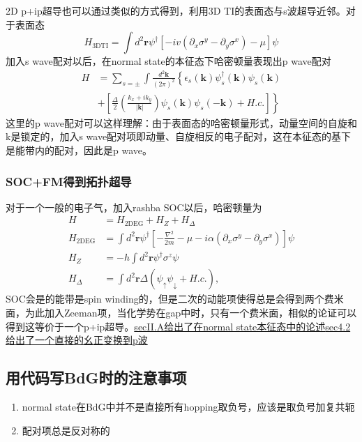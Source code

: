 \documentclass[10pt,openany]{book}
\theoremstyle{thmstyle} %
\theoremstyle{defstyle} %
\theoremstyle{prostyle} %
\begin{document}
2D p+ip超导也可以通过类似的方式得到，利用3D TI的表面态与s波超导近邻。对于表面态
\begin{equation}
  H_{3 \mathrm{DTI}}=\int d^2 \mathbf{r} \psi^{\dagger}\left[-i v\left(\partial_x \sigma^y-\partial_y \sigma^x\right)-\mu\right] \psi
\end{equation}
加入s wave配对以后，在normal state的本征态下哈密顿量表现出p wave配对
\begin{equation}
  \begin{aligned}
    H & =\sum_{s= \pm} \int \frac{d^2 \mathbf{k}}{(2 \pi)^2}\left\{\epsilon_s(\mathbf{k}) \psi_s^{\dagger}(\mathbf{k}) \psi_s(\mathbf{k})\right. \\
    & \left.+\left[\frac{\Delta}{2}\left(\frac{k_x+i k_y}{|\mathbf{k}|}\right) \psi_s(\mathbf{k}) \psi_s(-\mathbf{k})+H . c .\right]\right\}
    \end{aligned}
\end{equation}
这里的p wave配对可以这样理解：由于表面态的哈密顿量形式，动量空间的自旋和k是锁定的，加入s wave配对项即动量、自旋相反的电子配对，这在本征态的基下是能带内的配对，因此是p wave。
\subsubsection{SOC+FM得到拓扑超导}
对于一个一般的电子气，加入rashba SOC以后，哈密顿量为
\begin{equation}
  \begin{aligned}
    H & =H_{2 \mathrm{DEG}}+H_Z+H_{\Delta} \\
    H_{2 \mathrm{DEG}} & =\int d^2 \mathbf{r} \psi^{\dagger}\left[-\frac{\nabla^2}{2 m}-\mu-i \alpha\left(\partial_x \sigma^y-\partial_y \sigma^x\right)\right]\psi \\
    H_Z & =-h \int d^2 \mathbf{r} \psi^{\dagger} \sigma^z \psi \\
    H_{\Delta} & =\int d^2 \mathbf{r} \Delta\left(\psi_{\uparrow} \psi_{\downarrow}+H . c .\right),
    \end{aligned}
\end{equation}
SOC会是的能带是spin winding的，但是二次的动能项使得总是会得到两个费米面，为此加入Zeeman项，当化学势在gap中时，只有一个费米面，相似的论证可以得到这等价于一个p+ip超导。\href{https://journals.aps.org/prb/pdf/10.1103/PhysRevB.81.125318}{secII.A给出了在normal state本征态中的论述}\href{https://arxiv.org/pdf/1601.02726}{sec4.2给出了一个直接的幺正变换到p波}
\subsection{用代码写BdG时的注意事项}
\begin{enumerate}
  \item normal state在BdG中并不是直接所有hopping取负号，应该是取负号加复共轭
  \item 配对项总是反对称的
\end{enumerate}
\end{document}
